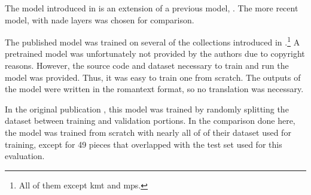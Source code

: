 
The model introduced in \textcite{micchi2021deep} is an
extension of a previous model, \textcite{micchi2020not}. The
more recent model, with \gls{nade} layers was chosen for
comparison.

The published model was trained on several of the
collections introduced in
.\footnote{All of
them except \gls{kmt} and \gls{mps}.} A pretrained model was
unfortunately not provided by the authors due to copyright
reasons. However, the source code and dataset necessary to
train and run the model was provided. Thus, it was easy to
train one from scratch. The outputs of the model were
written in the \gls{romantext} format, so no translation was
necessary. 

In the original publication \parencite{micchi2021deep}, this
model was trained by randomly splitting the dataset between
training and validation portions. In the comparison done
here, the model was trained from scratch with nearly all of
of their dataset used for training, except for 49 pieces
that overlapped with the test set used for this evaluation.
